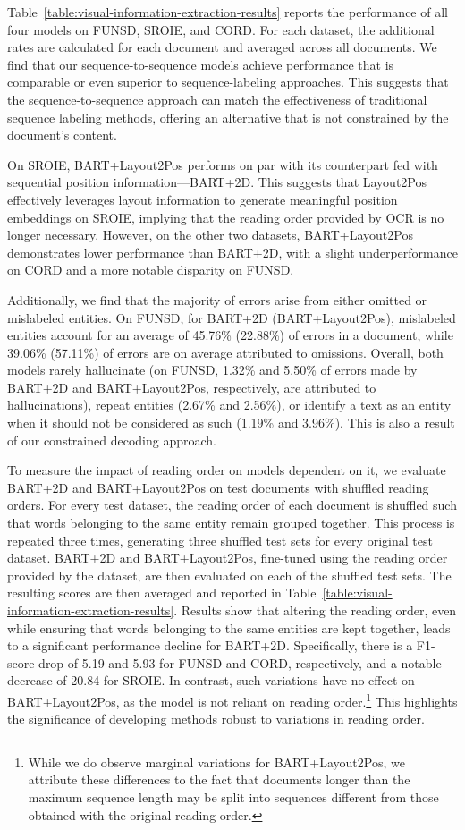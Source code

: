 Table~\ref{table:visual-information-extraction-results} reports the performance of all four models on FUNSD, SROIE, and CORD. For each dataset, the additional rates are calculated for each document and averaged across all documents. We find that our sequence-to-sequence models achieve performance that is comparable or even superior to sequence-labeling approaches. This suggests that the sequence-to-sequence approach can match the effectiveness of traditional sequence labeling methods, offering an alternative that is not constrained by the document's content. 

On SROIE, BART+Layout2Pos performs on par with its counterpart fed with sequential position information—BART+2D. This suggests that Layout2Pos effectively leverages layout information to generate meaningful position embeddings on SROIE, implying that the reading order provided by \ac{OCR} is no longer necessary. However, on the other two datasets, BART+Layout2Pos demonstrates lower performance than BART+2D, with a slight underperformance on CORD and a more notable disparity on FUNSD. 

Additionally, we find that the majority of errors arise from either omitted or mislabeled entities. On FUNSD, for BART+2D (BART+Layout2Pos), mislabeled entities account for an average of 45.76\% (22.88\%) of errors in a document, while 39.06\% (57.11\%) of errors are on average attributed to omissions. Overall, both models rarely hallucinate (on FUNSD, 1.32\% and 5.50\% of errors made by BART+2D and BART+Layout2Pos, respectively, are attributed to hallucinations), repeat entities (2.67\% and 2.56\%), or identify a text as an entity when it should not be considered as such (1.19\% and 3.96\%). This is also a result of our constrained decoding approach.

To measure the impact of reading order on models dependent on it, we evaluate BART+2D and BART+Layout2Pos on test documents with shuffled reading orders. For every test dataset, the reading order of each document is shuffled such that words belonging to the same entity remain grouped together. This process is repeated three times, generating three shuffled test sets for every original test dataset. BART+2D and BART+Layout2Pos, fine-tuned using the reading order provided by the dataset, are then evaluated on each of the shuffled test sets. The resulting scores are then averaged and reported in Table~\ref{table:visual-information-extraction-results}. Results show that altering the reading order, even while ensuring that words belonging to the same entities are kept together, leads to a significant performance decline for BART+2D. Specifically, there is a F1-score drop of 5.19 and 5.93 for FUNSD and CORD, respectively, and a notable decrease of 20.84 for SROIE. In contrast, such variations have no effect on BART+Layout2Pos, as the model is not reliant on reading order.\footnote{While we do observe marginal variations for BART+Layout2Pos, we attribute these differences to the fact that documents longer than the maximum sequence length may be split into sequences different from those obtained with the original reading order.} This highlights the significance of developing methods robust to variations in reading order.

